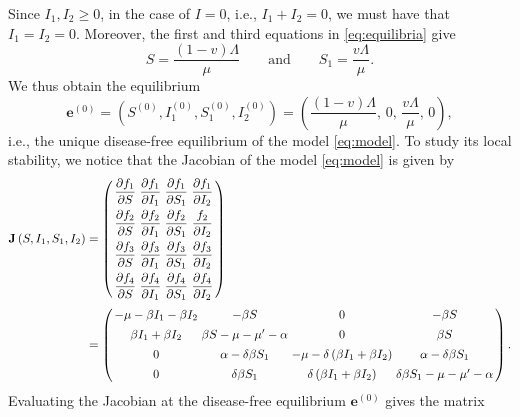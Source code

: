 \documentclass[11pt,reqno]{amsart}
\begin{document}
Since $I_1,I_2\geqslant0$, in the case of $I=0$, i.e., $I_1+I_2=0$, we must have that $I_1=I_2=0$. Moreover, the first and third equations in \eqref{eq:equilibria} give
$$S=\frac{(1-v)\Lambda}{\mu}\qquad\text{and}\qquad S_1=\frac{v\Lambda}{\mu}.$$
We thus obtain the equilibrium
\begin{equation}\label{eq:DFE}
\mathbf{e}^{\left( 0\right) } =\left( S^{\left( 0\right) },I_{1}^{\left( 0\right)
},S_{1}^{\left( 0\right) },I_{2}^{\left( 0\right) }\right)=\left( \frac{\left( 1-v \right) \Lambda }{\mu },\,0,\,\frac{v
\Lambda }{\mu },\,0\right),
\end{equation}
i.e., the unique disease-free equilibrium of the model \eqref{eq:model}. To study its local stability, we notice that the Jacobian of the model \eqref{eq:model} is given by
\begin{align*}
\mathbf{J}\left(S,I_1,S_1,I_2\right) &=\left( 
\begin{array}{cccc}
\dfrac{\partial f_1}{\partial S} & \dfrac{\partial f_1}{\partial I_{1}} & \dfrac{\partial f_1}{\partial S_{1}} & \dfrac{\partial f_1}{\partial I_{2}} \\[0.3cm]
\dfrac{\partial f_2}{\partial S} & \dfrac{\partial f_2
}{\partial I_{1}} & \dfrac{\partial f_2}{\partial S_{1}} & \dfrac{f_2}{\partial I_{2}} \\ [0.3cm]
\dfrac{\partial f_3}{\partial S} & \dfrac{\partial f_3}{\partial I_{1}} & \dfrac{\partial f_3}{\partial S_{1}} & \dfrac{\partial f_3}{\partial I_{2}} \\[0.3cm] 
\dfrac{\partial f_4}{\partial S} & \dfrac{\partial f_4}{\partial I_{1}} & \dfrac{\partial f_4}{\partial S_{1}} & \dfrac{\partial f_4}{\partial I_{2}}
\end{array}\right) \\[0.1cm]
&=\renewcommand{\arraycolsep}{1.5pt}\left( 
\begin{array}{cccc}
-\mu -\beta I_{1}-\beta I_{2} & -\beta S & 0 & -\beta S \\[0.15cm]
\beta I_{1}+\beta I_{2} & \beta S-\mu -\mu ^{\prime }-\alpha & 0 & \beta S
\\[0.15cm] 
0 & \alpha -\delta \beta S_{1} & -\mu -\delta \left( \beta I_{1}+\beta
I_{2}\right) & \alpha-\delta \beta S_{1} \\ [0.15cm]
0 & \delta \beta S_{1} & \delta \left( \beta I_{1}+\beta I_{2}\right) & 
\delta \beta S_{1} -\mu -\mu ^{\prime }-\alpha
\end{array}%
\right).
\end{align*}
Evaluating the Jacobian at the disease-free equilibrium $\mathbf{e}^{\left(0\right)}$ gives the matrix
\end{document}
